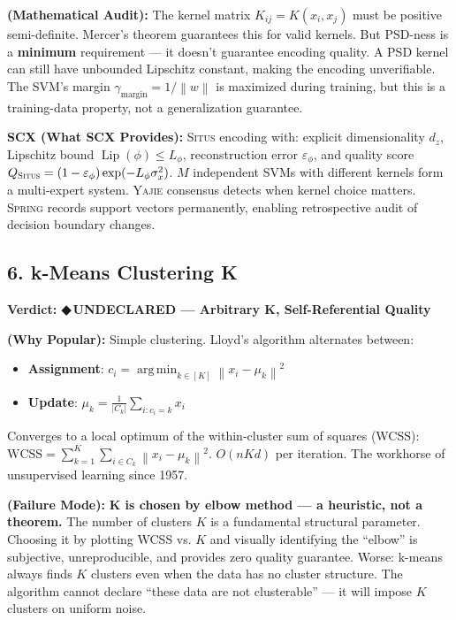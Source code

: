 \documentclass[12pt,a4paper]{article}
\theoremstyle{definition}
\newcommand{\guilty}{{\color{guiltycolor}\textbf{◆\,UNDECLARED}}}
\newcommand{\Situs}{\textsc{Situs}}
\newcommand{\Yajie}{\textsc{Yajie}}
\newcommand{\Spring}{\textsc{Spring}}
\DeclareMathOperator*{\argmin}{arg\,min}
\DeclareMathOperator{\Lip}{Lip}
\newcommand{\norm}[1]{\left\lVert#1\right\rVert}
\newcommand{\auditHeader}[1]{\medskip\noindent\textbf{\large #1}\medskip}
\newcommand{\whyPopular}{\noindent\textbf{ (Why Popular):} }
\newcommand{\whyFail}{\noindent\textbf{ (Failure Mode):} }
\newcommand{\whatMissing}{\noindent\textbf{SCX (What SCX Provides):} }
\newcommand{\mathAudit}{\noindent\textbf{ (Mathematical Audit):} }
\begin{document}
\mathAudit{} The kernel matrix $K_{ij} = K(x_i, x_j)$ must be positive semi-definite. Mercer's theorem guarantees this for valid kernels. But PSD-ness is a \textbf{minimum} requirement — it doesn't guarantee encoding quality. A PSD kernel can still have unbounded Lipschitz constant, making the encoding unverifiable. The SVM's margin $\gamma_{\text{margin}} = 1/\norm{w}$ is maximized during training, but this is a training-data property, not a generalization guarantee.

\whatMissing{} \Situs{} encoding with: explicit dimensionality $d_z$, Lipschitz bound $\Lip(\phi) \le L_\phi$, reconstruction error $\varepsilon_\phi$, and quality score $Q_{\Situs} = (1-\varepsilon_\phi)\exp(-L_\phi\sigma_x^2)$. $M$ independent SVMs with different kernels form a multi-expert system. \Yajie{} consensus detects when kernel choice matters. \Spring{} records support vectors permanently, enabling retrospective audit of decision boundary changes.

\subsection{6. k-Means Clustering K}

\auditHeader{Verdict: \guilty{} — Arbitrary K, Self-Referential Quality}

\whyPopular{} Simple clustering. Lloyd's algorithm alternates between:
\begin{itemize}[nosep]
    \item \textbf{Assignment}: $c_i = \argmin_{k \in [K]} \norm{x_i - \mu_k}^2$
    \item \textbf{Update}: $\mu_k = \frac{1}{|C_k|}\sum_{i: c_i=k} x_i$
\end{itemize}
Converges to a local optimum of the within-cluster sum of squares (WCSS): $\text{WCSS} = \sum_{k=1}^K \sum_{i \in C_k} \norm{x_i - \mu_k}^2$. $O(nKd)$ per iteration. The workhorse of unsupervised learning since 1957.

\whyFail{} \textbf{K is chosen by elbow method — a heuristic, not a theorem.} The number of clusters $K$ is a fundamental structural parameter. Choosing it by plotting WCSS vs. $K$ and visually identifying the ``elbow'' is subjective, unreproducible, and provides zero quality guarantee. Worse: k-means always finds $K$ clusters even when the data has no cluster structure. The algorithm cannot declare ``these data are not clusterable'' — it will impose $K$ clusters on uniform noise.
\end{document}
